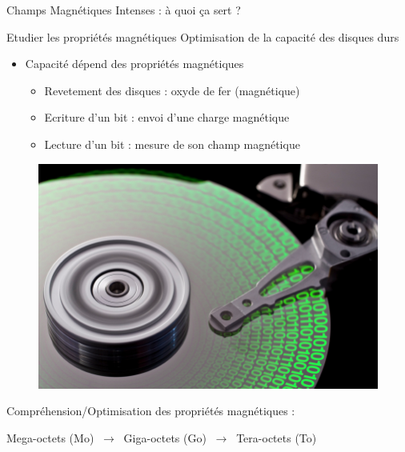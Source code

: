 \begin{frame}{Champs Magnétiques Intenses : à quoi ça sert ?}

  \begin{block}{Etudier les propriétés magnétiques}
    Optimisation de la capacité des disques durs
    \begin{itemize}
    \item Capacité dépend des propriétés magnétiques
      \begin{itemize}
      \item Revetement des disques : oxyde de fer (magnétique)
      \item Ecriture d'un bit : envoi d'une charge magnétique
      \item Lecture d'un bit : mesure de son champ magnétique
      \end{itemize}
    \end{itemize}
    \vspace*{-0.3cm}
    \begin{figure}[H]
      \centering
      \includegraphics[scale=0.2]{Figures/cmi/disk.png}
    \end{figure}

    Compréhension/Optimisation des propriétés magnétiques :
    \vspace*{-0.2cm}
    \begin{center}
      Mega-octets (Mo) $~\longrightarrow~$ Giga-octets (Go) $~\longrightarrow~$ Tera-octets (To)
    \end{center}
  \end{block}

\end{frame}

